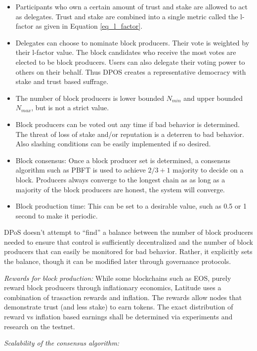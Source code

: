\begin{itemize}
\item Participants who own a certain amount of trust and stake are allowed to act as delegates. Trust and stake are
    combined into a single metric called the l-factor as given in Equation \ref{eq_l_factor}.
\item Delegates can choose to nominate block producers. Their vote is weighted by their l-factor value. The block
    candidates who receive the most votes are elected to be block producers. Users can also delegate their voting power
        to others on their behalf. Thus DPOS creates a representative democracy with stake and trust based suffrage.
\item The number of block producers is lower bounded $N_{min}$ and upper bounded $N_{max}$, but is not a strict value.

\item Block producers can be voted out any time if bad behavior is determined. The threat of loss of stake and/or
    reputation is a deterren to bad behavior. Also slashing conditions can be easily implemented if so desired.
\item Block consensus: Once a block producer set is determined, a consensus algorithm such as PBFT is used to
    achieve $2/3 +1$ majority to decide on a block. Producers always converge to the longest chain as as long as a
        majority of the block producers are honest, the system will converge.
\item Block production time: This can be set to a desirable value, such as 0.5 or 1 second to make it periodic.
\end{itemize}

DPoS doesn’t attempt to “find” a balance between the number of block producers needed to ensure that control is
sufficiently decentralized and the number of block producers that can easily be monitored for bad behavior. Rather, it
explicitly sets the balance, though it can be modified later through governance protocols.

\noindent
{\em Rewards for block production:} While some blockchains such as EOS, purely reward block producers through inflationary
economics, Latitude uses a combination of trasaction rewards and inflation. The rewards allow nodes that demonstrate
trust (and less stake) to earn tokens. The exact distribution of reward vs inflation based earnings shall be determined
via experiments and research on the testnet.

\noindent
{\em Scalability of the consensus algorithm:}

